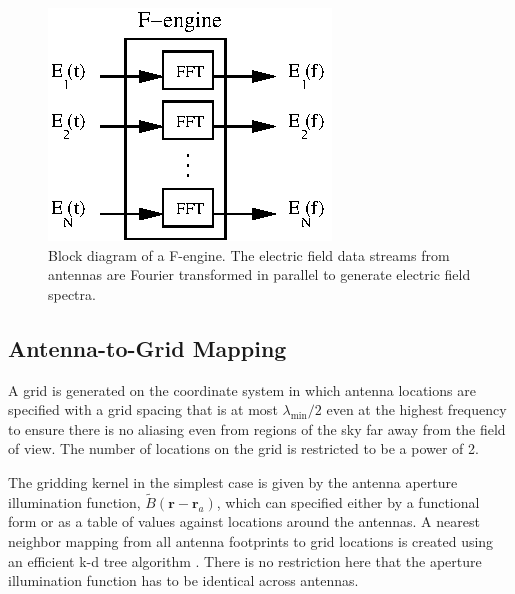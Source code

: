 \documentclass[a4paper,fleqn,usenatbib]{../mnras}
\begin{document}
\begin{figure}
  \includegraphics[width=\columnwidth]{F-engine.eps}
  \caption{Block diagram of a F-engine. The electric field data streams from antennas are Fourier transformed in parallel to generate electric field spectra.}
  \label{fig:f-engine}
\end{figure}

\subsection{Antenna-to-Grid Mapping}

A grid is generated on the coordinate system in which antenna locations are specified with a grid spacing that is at most $\lambda_\textrm{min}/2$ even at the highest frequency to ensure there is no aliasing even from regions of the sky far away from the field of view. The number of locations on the grid is restricted to be a power of 2. 

The gridding kernel in the simplest case is given by the antenna aperture illumination function, $\widetilde{B}(\mathbf{r}-\mathbf{r}_a)$, which can specified either by a functional form or as a table of values against locations around the antennas. A nearest neighbor mapping from all antenna footprints to grid locations is created using an efficient k-d tree algorithm \citep{man99}. There is no restriction here that the aperture illumination function has to be identical across antennas. 
\end{document}

